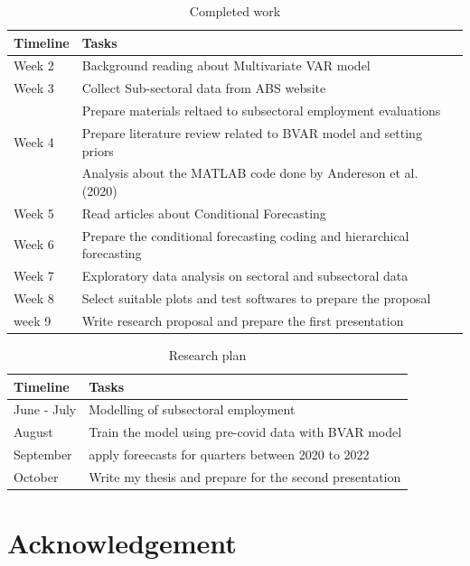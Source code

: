 \documentclass[11pt,a4paper,]{article}
\begin{document}
\begin{table}

\caption{\label{tab:timeline1}Completed work}
\centering
\begin{tabular}[t]{ll}
\toprule
Timeline & Tasks\\
\midrule
Week 2 & Background reading about Multivariate VAR model\\
Week 3 & Collect Sub-sectoral data from ABS website\\
 & Prepare materials reltaed to subsectoral employment evaluations\\
Week 4 & Prepare literature review related to BVAR model and setting priors\\
 & Analysis about the MATLAB code done by Andereson et al. (2020)\\
\addlinespace
Week 5 & Read articles about Conditional Forecasting\\
Week 6 & Prepare the conditional forecasting coding and hierarchical forecasting\\
Week 7 & Exploratory data analysis on sectoral and subsectoral data\\
Week 8 & Select suitable plots and test softwares to prepare the proposal\\
week 9 & Write research proposal and prepare the first presentation\\
\bottomrule
\end{tabular}
\end{table}

\begin{table}

\caption{\label{tab:timeline2}Research plan}
\centering
\begin{tabular}[t]{ll}
\toprule
Timeline & Tasks\\
\midrule
June - July & Modelling of subsectoral employment\\
August & Train the model using pre-covid data with BVAR model\\
September & apply foreecasts for quarters between 2020 to 2022\\
October & Write my thesis and prepare for the second presentation\\
\bottomrule
\end{tabular}
\end{table}

\newpage

\hypertarget{acknowledgement}{%
\section{Acknowledgement}\label{acknowledgement}}
\end{document}
